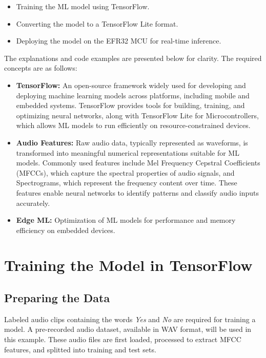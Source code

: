 \documentclass[
  9pt,
  letterpaper,
  abstract,
  titlepage]{scrbook}
\begin{document}
\begin{itemize}
\item
  Training the ML model using TensorFlow.
\item
  Converting the model to a TensorFlow Lite format.
\item
  Deploying the model on the EFR32 MCU for real-time inference.
\end{itemize}

The explanations and code examples are presented below for clarity. The
required concepts are as follows:

\begin{itemize}
\item
  \textbf{TensorFlow:} An open-source framework widely used for
  developing and deploying machine learning models across platforms,
  including mobile and embedded systems. TensorFlow provides tools for
  building, training, and optimizing neural networks, along with
  TensorFlow Lite for Microcontrollers, which allows ML models to run
  efficiently on resource-constrained devices.
\item
  \textbf{Audio Features:} Raw audio data, typically represented as
  waveforms, is transformed into meaningful numerical representations
  suitable for ML models. Commonly used features include Mel Frequency
  Cepstral Coefficients (MFCCs), which capture the spectral properties
  of audio signals, and Spectrograms, which represent the frequency
  content over time. These features enable neural networks to identify
  patterns and classify audio inputs accurately.
\item
  \textbf{Edge ML:} Optimization of ML models for performance and memory
  efficiency on embedded devices.
\end{itemize}

\section{Training the Model in
TensorFlow}\label{training-the-model-in-tensorflow}

\subsection{Preparing the Data}\label{preparing-the-data}

Labeled audio clips containing the words \emph{Yes} and \emph{No} are
required for training a model. A pre-recorded audio dataset, available
in WAV format, will be used in this example. These audio files are first
loaded, processed to extract MFCC features, and splitted into training
and test sets.
\end{document}
